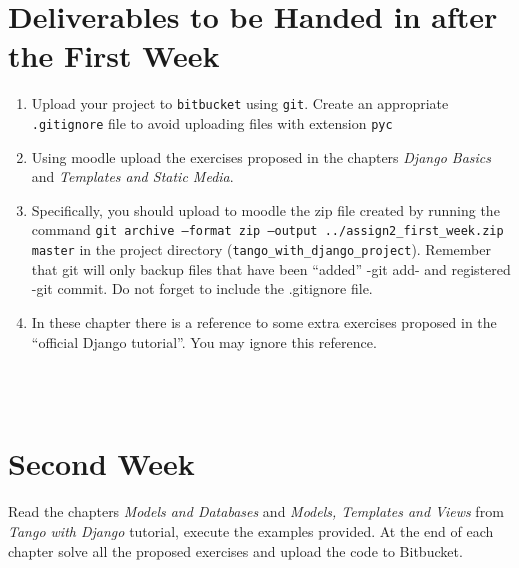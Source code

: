 \documentclass[12pt]{article} %
\newcounter{ejercicioNo}
\begin{document}
\section{Deliverables to be Handed in after the First Week}

\begin{minipage}{\linewidth}
\begin{framed}
\begin{enumerate}

\item Upload your project to \texttt {bitbucket} using \texttt{git}. Create an appropriate  \texttt{.gitignore} file to avoid uploading files with extension \texttt{pyc}

\item Using moodle upload the exercises proposed in the chapters \textit{Django Basics} and \textit{Templates and Static Media}.

\item Specifically, you should upload to moodle the  zip file created by running the command \texttt{git archive --format zip --output ../assign2\_first\_week.zip  master} in the project directory (\texttt{tango\_with\_django\_project}). Remember that git will only backup files
that have been ``added'' -git add- and registered -git commit. Do not forget to include the .gitignore file.

\item In these chapter there is a reference to some extra exercises proposed in  the ``official Django tutorial''. You may ignore this reference.

 \end{enumerate}
\end{framed}
\end{minipage}\\\\




\section{Second Week}

Read the chapters \textit{Models and Databases} and  \textit{Models, Templates and Views}  from  \textit{Tango with Django} tutorial, execute the examples provided. At the end of each chapter solve all the proposed exercises and upload the code to Bitbucket.
\end{document}
